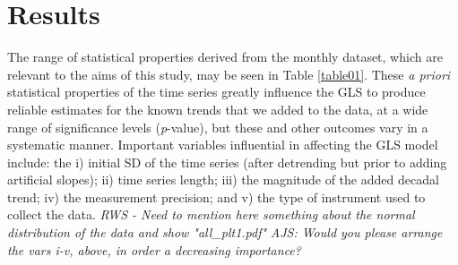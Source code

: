 \documentclass{ametsoc}
\begin{document}
\section{Results}
The range of statistical properties derived from the monthly dataset, which are relevant to the aims of this study, may be seen in Table \ref{table01}. These \emph{a priori} statistical properties of the time series greatly influence the GLS to produce reliable estimates for the known trends that we added to the data, at a wide range of significance levels (\emph{p}-value), but these and other outcomes vary in a systematic manner. Important variables influential in affecting the GLS model include: the i) initial SD of the time series (after detrending but prior to adding artificial slopes); ii) time series length; iii) the magnitude of the added decadal trend; iv) the measurement precision; and v) the type of instrument used to collect the data.
\emph{RWS - Need to mention here something about the normal distribution of the data and show "all_plt1.pdf"}
\emph{AJS: Would you please arrange the vars i-v, above, in order a decreasing importance?}


%

\end{document}
